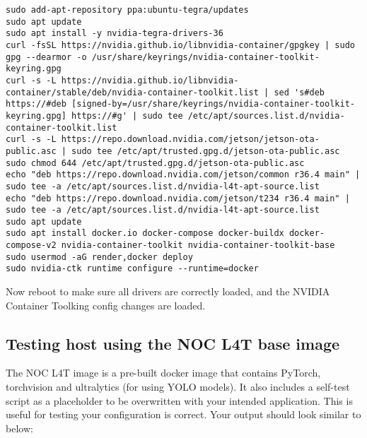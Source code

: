 \documentclass[11pt]{article}
\begin{document}


\lstset{style=console}
\begin{lstlisting}
sudo add-apt-repository ppa:ubuntu-tegra/updates
sudo apt update
sudo apt install -y nvidia-tegra-drivers-36
curl -fsSL https://nvidia.github.io/libnvidia-container/gpgkey | sudo gpg --dearmor -o /usr/share/keyrings/nvidia-container-toolkit-keyring.gpg
curl -s -L https://nvidia.github.io/libnvidia-container/stable/deb/nvidia-container-toolkit.list | sed 's#deb https://#deb [signed-by=/usr/share/keyrings/nvidia-container-toolkit-keyring.gpg] https://#g' | sudo tee /etc/apt/sources.list.d/nvidia-container-toolkit.list
curl -s -L https://repo.download.nvidia.com/jetson/jetson-ota-public.asc | sudo tee /etc/apt/trusted.gpg.d/jetson-ota-public.asc
sudo chmod 644 /etc/apt/trusted.gpg.d/jetson-ota-public.asc
echo "deb https://repo.download.nvidia.com/jetson/common r36.4 main" | sudo tee -a /etc/apt/sources.list.d/nvidia-l4t-apt-source.list
echo "deb https://repo.download.nvidia.com/jetson/t234 r36.4 main" | sudo tee -a /etc/apt/sources.list.d/nvidia-l4t-apt-source.list
sudo apt update
sudo apt install docker.io docker-compose docker-buildx docker-compose-v2 nvidia-container-toolkit nvidia-container-toolkit-base
sudo usermod -aG render,docker deploy
sudo nvidia-ctk runtime configure --runtime=docker
\end{lstlisting}

Now reboot to make sure all drivers are correctly loaded, and the NVIDIA Container Toolking config changes are loaded.


\subsection{Testing host using the NOC L4T base image}

The NOC L4T image is a pre-built docker image that contains PyTorch, torchvision and ultralytics (for using YOLO models). It also includes a self-test script as a placeholder to be overwritten with your intended application. This is useful for testing your configuration is correct. Your output should look similar to below:
\end{document}
